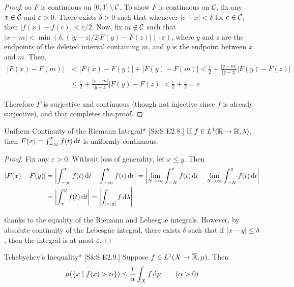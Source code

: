 \begin{proof}
    so $F$ is continuous on $[0,1] \setminus \mathcal{C}$. To show $F$ is continuous on $\mathcal{C}$, fix any $x \in \mathcal{C}$ and $\varepsilon > 0$. There exists $\delta > 0$ such that whenever $|c - x| < \delta$ for $c \in \mathcal{C}$, then $|f(x) - f(c)| < \varepsilon / 2$. Now, fix $m \not\in \mathcal{C}$ such that $|x - m| < \min(\delta, (|y - z| / 2|F(y) - F(z)|) \cdot \varepsilon)$, where $y$ and $z$ are the endpoints of the deleted interval containing $m$, and $y$ is the endpoint between $x$ and $m$. Then, 
    \begin{align*}
        |F(x) - F(m)|
        &< |F(x) - F(y)| + |F(y) - F(m)|
        < \frac{\varepsilon}{2} + \frac{|y - m|}{|y - z|} |F(y) - F(z)| \\
        &\leq \frac{\varepsilon}{2} + \frac{|x -m|}{|y - z|} |F(y) - F(z)|
        < \frac{\varepsilon}{2} + \frac{\varepsilon}{2} 
        = \varepsilon
    \end{align*}

    Therefore $F$ is surjective and continuous (though not injective since $f$ is already surjective), and that completes the proof. 
\end{proof}

\begin{problem}{Uniform Continuity of the Riemann Integral}*
    [S\&S E2.8.] If $f \in L^1(\mathbb{R} \to \mathbb{R}, \lambda)$, then $F(x) = \int_{-\infty}^x f(t) \, \mathrm{d}t$ is uniformly continuous.
\end{problem}

\begin{proof}
    Fix any $\varepsilon > 0$. Without loss of generality, let $x \leq y$. Then
    \begin{align*}
        |F(x) - F(y)| 
        &= \left| \int_{-\infty}^x f(t) \, \mathrm{d}t - \int_{-\infty}^y f(t) \, \mathrm{d}t \right| 
        = \left| \lim_{N \to \infty} \int_{-N}^x f(t) \,\mathrm{d}t - \lim_{N \to \infty} \int_{-N}^y f(t) \, \mathrm{d}t \right|  \\
        &= \left| \int_x^y f(t) \, \mathrm{d}t \right| 
        = \left| \int_{[x, y]} f \, \mathrm{d} \lambda \right| 
    \end{align*}

    thanks to the equality of the Riemann and Lebesgue integrals. However, by absolute continuity of the Lebesgue integral, there exists $\delta$ such that if $|x - y| \leq \delta$, then the integral is at most $\varepsilon$.
\end{proof}

\begin{problem}{Tchebychev's Inequality}*
    [S\&S E2.9.] Suppose $f \in L^1(X \to \overline{\mathbb{R}}, \mu)$. Then
    $$
    \mu(\{x \mid f(x) > \alpha\}) \leq \frac{1}{\alpha} \int_{X} f \, \mathrm{d}\mu \qquad (\alpha > 0)
    $$
\end{problem}

